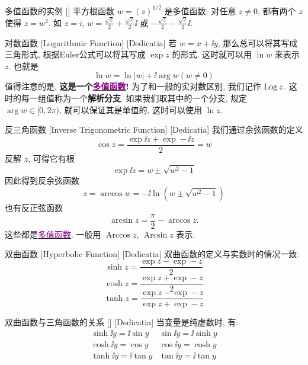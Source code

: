 \documentclass[UTF8]{ctexart}
\newcommand{\hyperrefc}[2]{\hyperref[#1]{\textcolor{purple}{#2}}}
\begin{document}
        \begin{xmp}
            {多值函数的实例}
            []
            平方根函数 \(w=(z)^{1/2}\) 是多值函数: 对任意 \(z\neq 0\), 都有两个 \(z\) 使得 \(z=w^2\). 如 \(z=i\),  \(w=\frac{\sqrt{2}}{2}+\frac{\sqrt{2}}{2}\ii\) 或 \(-\frac{\sqrt{2}}{2}-\frac{\sqrt{2}}{2}\ii\).
        \end{xmp}

        \begin{dfn}
            [Logarithmic]
            {对数函数}
            [Logarithmic Function]
            [Dedicatia]
            若 \(w=x+\ii y\), 那么总可以将其写成三角形式, 根据Euler公式可以将其写成 \(\exp z\) 的形式. 这时就可以用 \(\ln w\) 来表示 \(z\). 也就是
            \[\ln w=\ln|w|+\ii\arg w (w\neq 0)\]
            值得注意的是, \textbf{这是一个\hyperrefc{dfn:Multivalued}{多值函数}! }为了和一般的实对数区别, 我们记作 \(\operatorname{Log} z\). 这时的每一组值称为一个\textbf{解析分支}. 如果我们取其中的一个分支, 规定 \(\arg w\in[0,2\pi)\), 就可以保证其是单值的, 这时可以使用 \(\ln z\).
        \end{dfn}

        \begin{dfn}
            [InverseTriangular]
            {反三角函数}
            [Inverse Trigonometric Function]
            [Dedicatia]
            我们通过余弦函数的定义
            \[\cos z=\frac{\exp\ii z+\exp -\ii z}{2}=w\]
            反解 \(z\), 可得它有根
            \[\exp\ii z=w\pm\sqrt{w^2-1}\]
            因此得到反余弦函数
            \[z=\arccos w=-\ii\ln(w\pm\sqrt{w^2-1})\]
            也有反正弦函数
            \[\arcsin z=\frac{\pi}{2}-\arccos z.\]
            这些都是\hyperrefc{dfn:Multivalued}{多值函数}. 一般用 \(\operatorname{Arccos}z\),  \(\operatorname{Arcsin}z\) 表示. \\
        \end{dfn}

        \begin{dfn}
            [HyperbolicFunction]
            {双曲函数}
            [Hyperbolic Function]
            [Dedicatia]
            双曲函数的定义与实数时的情况一致: 
            \[\sinh z=\frac{\exp z-\exp -z}{2}\]
            \[\cosh z=\frac{\exp z+\exp -z}{2}\]
            \[\tanh z=\frac{\exp z-\exp -z}{\exp z+\exp -z}\]
        \end{dfn}

        \begin{ppt}
            [UUID]
            {双曲函数与三角函数的关系}
            []
            [Dedicatia]
            当变量是纯虚数时, 有: 
            \[\begin{array}{cc}
                \sinh\ii y=\ii\sin y&\sin\ii y=\ii\sinh y\\
                \cosh\ii y=\cos y&\cos\ii y=\cosh y\\
                \tanh\ii y=\ii\tan y&\tan\ii y=\ii\tan y
            \end{array}\]
        \end{ppt}
\end{document}
